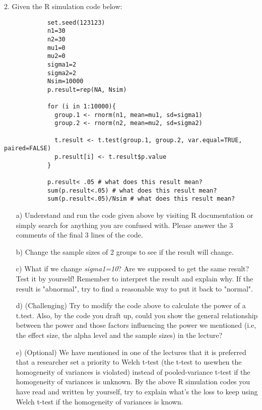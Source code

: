 \documentclass[12pt,a4paper]{article}
\begin{document}
	2. Given the R simulation code below:
	
	\begin{verbatim}
	        set.seed(123123)
	        n1=30
	        n2=30
	        mu1=0
	        mu2=0
	        sigma1=2
	        sigma2=2
	        Nsim=10000
	        p.result=rep(NA, Nsim)
		
	        for (i in 1:10000){
	          group.1 <- rnorm(n1, mean=mu1, sd=sigma1)
	          group.2 <- rnorm(n2, mean=mu2, sd=sigma2)
			
	          t.result <- t.test(group.1, group.2, var.equal=TRUE, paired=FALSE)
	          p.result[i] <- t.result$p.value
	        }
		
	        p.result< .05 # what does this result mean?
	        sum(p.result<.05) # what does this result mean?
	        sum(p.result<.05)/Nsim # what does this result mean?
	\end{verbatim}
	
	\begin{enumerate}
		\item[a)] Understand and run the code given above by visiting R documentation or simply search for anything you are confused with. Please answer the 3 comments of the final 3 lines of the code.
		\item[b)] Change the sample sizes of 2 groups to see if the result will change.
		\item[c)] What if we change \textit{sigma1=10}? Are we supposed to get the same result? Test it by yourself! Remember to interpret the result and explain why. If the result is "abnormal", try to find a reasonable way to put it back to "normal".
		\item[d)] (Challenging) Try to modify the code above to calculate the power of a t.test. Also, by the code you draft up, could you show the general relationship between the power and those factors influencing the power we mentioned (i.e, the effect size, the alpha level and the sample sizes) in the lecture?
		\item[e)] (Optional) We have mentioned in one of the lectures that it is preferred that a researcher set a priority to Welch t-test (the t-test to usewhen the homogeneity of variances is violated) instead of pooled-variance t-test if the homogeneity of variances is unknown. By the above R simulation codes you have read and written by yourself, try to explain what's the loss to keep using Welch t-test if the homogeneity of variances is known.
	\end{enumerate}
	
\end{document}
